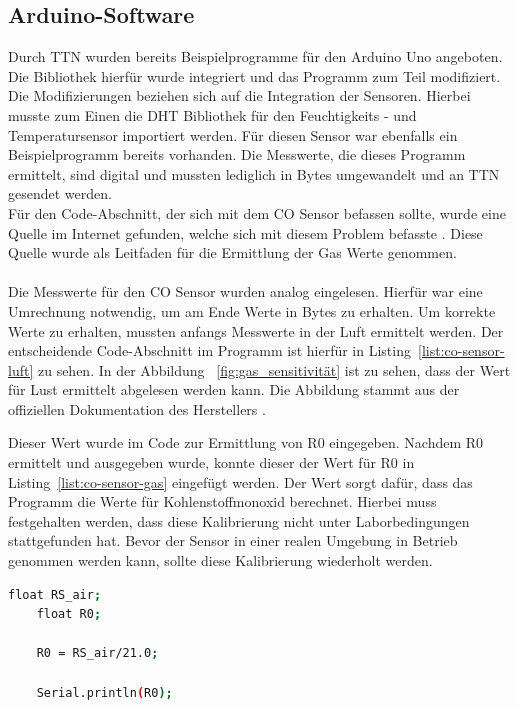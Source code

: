 \documentclass{article}
\begin{document}
\subsection{Arduino-Software}
Durch TTN wurden bereits Beispielprogramme für den Arduino Uno angeboten.
Die Bibliothek hierfür wurde integriert und das Programm zum Teil modifiziert.
Die Modifizierungen beziehen sich auf die Integration der Sensoren.
Hierbei musste zum Einen die DHT Bibliothek für den Feuchtigkeits - und Temperatursensor importiert werden. 
Für diesen Sensor war ebenfalls ein Beispielprogramm bereits vorhanden. 
Die Messwerte, die dieses Programm ermittelt, sind digital und mussten lediglich in Bytes umgewandelt und an TTN gesendet werden.\\
Für den Code-Abschnitt, der sich mit dem CO Sensor befassen sollte, wurde eine Quelle im Internet gefunden, welche sich mit diesem Problem befasste \cite{seeed-wiki}.
Diese Quelle wurde als Leitfaden für die Ermittlung der Gas Werte genommen.\\
\\
Die Messwerte für den CO Sensor wurden analog eingelesen. Hierfür war eine Umrechnung notwendig, um am Ende Werte in Bytes zu erhalten.
Um korrekte Werte zu erhalten, mussten anfangs Messwerte in der Luft ermittelt werden. Der entscheidende Code-Abschnitt im Programm ist hierfür in Listing~\ref{list:co-sensor-luft} zu sehen.
In der Abbildung ~\ref{fig:gas_sensitivität} ist zu sehen, dass der Wert für Lust ermittelt abgelesen werden kann. Die Abbildung stammt aus der offiziellen Dokumentation des Herstellers \cite{gas-sensor-datenblatt}.

Dieser Wert wurde im Code zur Ermittlung von R0 eingegeben.
Nachdem R0 ermittelt und ausgegeben wurde, konnte dieser der Wert für R0 in Listing~\ref{list:co-sensor-gas} eingefügt werden.
Der Wert sorgt dafür, dass das Programm die Werte für Kohlenstoffmonoxid berechnet.
Hierbei muss festgehalten werden, dass diese Kalibrierung nicht unter Laborbedingungen stattgefunden hat.
Bevor der Sensor in einer realen Umgebung in Betrieb genommen werden kann, sollte diese Kalibrierung wiederholt werden.

\begin{lstlisting}[language=Bash, caption=Messung des CO Sensors für Luftwerte, label=list:co-sensor-luft]
    float RS_air; 
    float R0;  

    R0 = RS_air/21.0; 
 
    Serial.println(R0);
\end{lstlisting}
\end{document}
